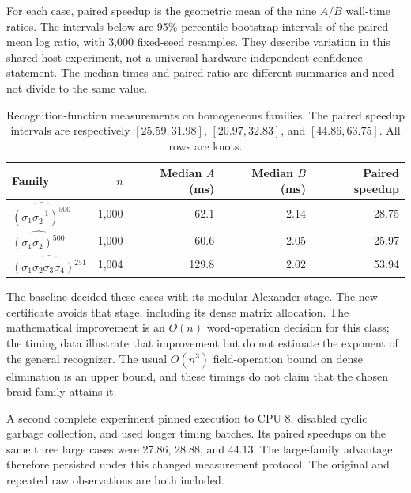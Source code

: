 For each case, paired speedup is the geometric mean of the nine $A/B$
wall-time ratios. The intervals below are 95\% percentile bootstrap
intervals of the paired mean log ratio, with 3,000 fixed-seed resamples.
They describe variation in this shared-host experiment, not a universal
hardware-independent confidence statement. The median times and paired
ratio are different summaries and need not divide to the same value.

\begin{table}[htbp]
\centering\small
\begin{tabular}{@{}lrrrr@{}}
\toprule
Family & $n$ & Median $A$ (ms) & Median $B$ (ms) & Paired speedup\\
\midrule
$\widehat{(\sigma_1\sigma_2^{-1})^{500}}$ & 1,000 & 62.1 & 2.14 & 28.75\\
$\widehat{(\sigma_1\sigma_2)^{500}}$ & 1,000 & 60.6 & 2.05 & 25.97\\
$\widehat{(\sigma_1\sigma_2\sigma_3\sigma_4)^{251}}$ & 1,004 & 129.8 & 2.02 & 53.94\\
\bottomrule
\end{tabular}
\caption{Recognition-function measurements on homogeneous families. The
paired speedup intervals are respectively $[25.59,31.98]$,
$[20.97,32.83]$, and $[44.86,63.75]$. All rows are knots.}
\label{tab:structural}
\end{table}

The baseline decided these cases with its modular Alexander stage. The new
certificate avoids that stage, including its dense matrix allocation.
The mathematical improvement is an $O(n)$ word-operation decision for this
class; the timing data illustrate that improvement but do not estimate the
exponent of the general recognizer. The usual $O(n^3)$ field-operation
bound on dense elimination is an upper bound, and these timings do not
claim that the chosen braid family attains it.

A second complete experiment pinned execution to CPU 8, disabled cyclic
garbage collection, and used longer timing batches. Its paired speedups on
the same three large cases were 27.86, 28.88, and 44.13. The large-family
advantage therefore persisted under this changed measurement protocol.
The original and repeated raw observations are both included.

